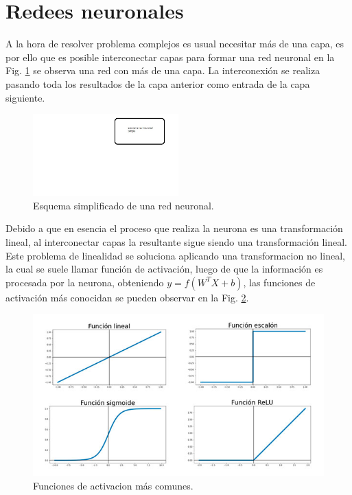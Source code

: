 \section{Redees neuronales}

A la hora de resolver problema complejos es usual necesitar más de una capa, es por ello que es posible interconectar capas para formar una red neuronal en la Fig. \ref{fig:esquema-redes} se observa una red con más de una capa. La interconexión se realiza pasando toda los resultados de la capa anterior como entrada de la capa siguiente.

\begin{figure}[h]
    \centering
    \includegraphics[width=0.5\textwidth]{imgs/Redes-esquema.jpg}
    \caption{Esquema simplificado de una red neuronal.}
    \label{fig:esquema-redes}
\end{figure}

Debido a que en esencia el proceso que realiza la neurona es una transformación lineal, al interconectar capas la resultante sigue siendo una transformación lineal.
Este problema de linealidad se soluciona aplicando una transformacion no lineal, la cual se suele llamar función de activación,
luego de que la información es procesada por la neurona, obteniendo $y= f(W^T X + b)$, las funciones de activación más conocidan se pueden observar en la
Fig. \ref{fig:funciones-activacion}.

\begin{figure}
    \centering
    \includegraphics[width=1\textwidth]{imgs/Funciones-de-activacion.jpg}
    \caption{Funciones de activacion más comunes.}
    \label{fig:funciones-activacion}
\end{figure}

